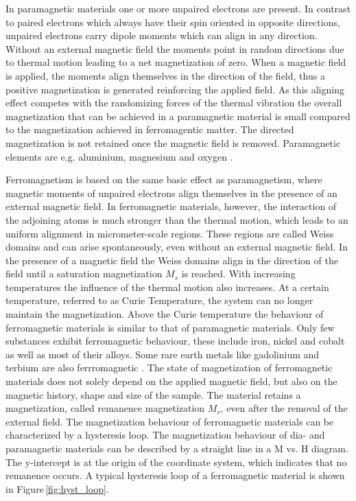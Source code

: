 In paramagnetic materials one or more unpaired electrons are present. In contrast to paired electrons which always have their spin oriented in opposite directions, unpaired electrons carry dipole moments which can align in any direction. Without an external magnetic field the moments point in random directions due to thermal motion leading to a net magnetization of zero. When a magnetic field is applied, the moments align themselves in the direction of the field, thus a positive magnetization is generated reinforcing the applied field. As this aligning effect competes with the randomizing forces of the thermal vibration the overall magnetization that can be achieved in a paramagnetic material is small compared to the magnetization achieved in ferromagentic matter. The directed magnetization is not retained once the magnetic field is removed. Paramagnetic elements are e.g. aluminium, magnesium and oxygen \cite{svoboda2004magnetic,griffiths2011elektrodynamik}.

Ferromagnetism is based on the same basic effect as paramagnetism, where magnetic moments of unpaired electrons align themselves in the presence of an external magnetic field. In ferromagnetic materials, however, the interaction of the adjoining atoms is much stronger than the thermal motion, which leads to an uniform alignment in micrometer-scale regions. These regions are called Weiss domains and can arise spontaneously, even without an external magnetic field. In the presence of a magnetic field the Weiss domains align in the direction of the field until a saturation magnetization $M_{s}$ is reached. With increasing temperatures the influence of the thermal motion also increases. At a certain temperature, referred to as Curie Temperature, the system can no longer maintain the magnetization. Above the Curie temperature the behaviour of ferromagnetic materials is similar to that of paramagnetic materials. Only few substances exhibit ferromagnetic behaviour, these include iron, nickel and cobalt as well as most of their alloys. Some rare earth metals like gadolinium and terbium are also ferrromagnetic \cite{svoboda2004magnetic}. The state of magnetization of ferromagnetic materials does not solely depend on the applied magnetic field, but also on the magnetic history, shape and size of the sample. The material retains a magnetization, called remanence magnetization $M_{r}$, even after the removal of the external field. The magnetization behaviour of ferromagnetic materials can be characterized by a hysteresis loop. The magnetization behaviour of dia- and paramagnetic materials can be described by a straight line in a M vs. H diagram. The y-intercept is at the origin of the coordinate system, which indicates that no remanence occurs. A typical hysteresis loop of a ferromagnetic material is shown in Figure\,\ref{fig:hyst_loop}. 

